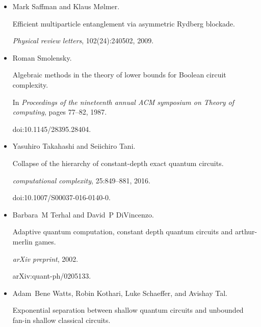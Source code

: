 \documentclass[10pt,a4paper]{article}
\begin{document}
\begin{itemize}
doi:10.4230/LIPIcs.ITCS.2021.32.





\item[] 
[22]

Mark Saffman and Klaus Mølmer.


Efficient multiparticle entanglement via asymmetric Rydberg
blockade.


\emph{Physical review letters}, 102(24):240502, 2009.





\item[] 
[23]

Roman Smolensky.


Algebraic methods in the theory of lower bounds for Boolean circuit
complexity.


In \emph{Proceedings of the nineteenth annual ACM symposium on Theory
of computing}, pages 77–82, 1987.


doi:10.1145/28395.28404.





\item[] 
[24]

Yasuhiro Takahashi and Seiichiro Tani.


Collapse of the hierarchy of constant-depth exact quantum circuits.


\emph{computational complexity}, 25:849–881, 2016.


doi:10.1007/S00037-016-0140-0.





\item[] 
[25]

Barbara M Terhal and David P DiVincenzo.


Adaptive quantum computation, constant depth quantum circuits and
arthur-merlin games.


\emph{arXiv preprint}, 2002.


arXiv:quant-ph/0205133.





\item[] 
[26]

Adam Bene Watts, Robin Kothari, Luke Schaeffer, and Avishay Tal.


Exponential separation between shallow quantum circuits and unbounded
fan-in shallow classical circuits.



\end{itemize}
\end{document}

